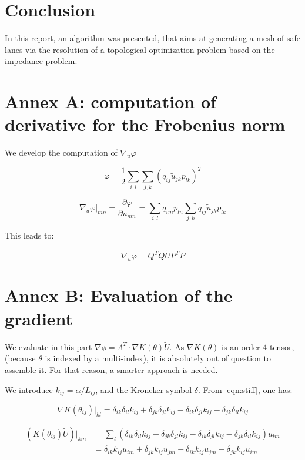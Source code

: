 \documentclass[11pt,a4paper]{article}		%
\begin{document}
\section{Conclusion}

In this report, an algorithm was presented, that aims at generating a mesh of safe lanes via the resolution of a topological optimization problem based on the impedance problem.

\section*{Annex A: computation of derivative for the Frobenius norm}

We develop the computation of $\nabla_u\varphi$

\begin{equation}
\varphi = \dfrac{1}{2} \sum_{i,l} \sum_{j,k} \left(q_{ij} \tilde{u}_{jk} p_{lk}\right)^2
\end{equation}

\begin{equation}
\nabla_u\varphi|_{mn} = \dfrac{\partial\varphi}{\partial u_{mn}} = \sum_{i,l} q_{im}p_{ln} \sum_{j,k} q_{ij} \tilde{u}_{jk} p_{lk}
\end{equation}

This leads to:

\begin{equation}
\nabla_u\varphi = Q^TQ\tilde{U}P^TP
\end{equation}

\section*{Annex B: Evaluation of the gradient}

We evaluate in this part $\nabla\phi = \Lambda^T \cdot \nabla K(\theta) \tilde{U}$. As $\nabla K(\theta)$ is an order $4$ tensor, (because $\theta$ is indexed by a multi-index), it is absolutely out of question to assemble it. For that reason, a smarter approach is needed.

We introduce $k_{ij} = \alpha/L_{ij}$, and the Kroneker symbol $\delta$. From \eqref{eqn:stiff}, one has:

\begin{equation}
\nabla K(\theta_{ij})|_{kl} = \delta_{ik} \delta_{il} k_{ij} + \delta_{jk} \delta_{jl} k_{ij} - \delta_{ik} \delta_{jl} k_{ij} - \delta_{jk} \delta_{il} k_{ij}
\end{equation}

\begin{equation}
\begin{aligned}
\left( K(\theta_{ij}) \tilde{U} \right)|_{km} &= \sum_l \left( \delta_{ik} \delta_{il} k_{ij} + \delta_{jk} \delta_{jl} k_{ij} - \delta_{ik} \delta_{jl} k_{ij} - \delta_{jk} \delta_{il} k_{ij} \right) u_{lm}\\
&= \delta_{ik} k_{ij} u_{im} + \delta_{jk} k_{ij} u_{jm} - \delta_{ik} k_{ij} u_{jm} - \delta_{jk} k_{ij} u_{im}
\end{aligned}
\end{equation}
\end{document}
